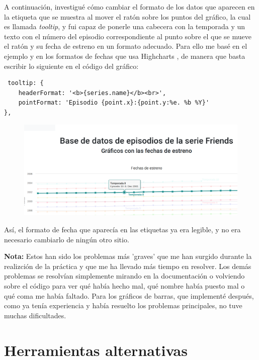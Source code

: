 \documentclass[12pt]{article}
\begin{document}
A continuación, investigué cómo cambiar el formato de los datos que aparecen en la etiqueta que se muestra al mover el ratón sobre los puntos del gráfico, la cual es llamada \textit{tooltip}, y fui capaz de ponerle una cabecera con la temporada y un texto con el número del episodio correspondiente al punto sobre el que se mueve el ratón y su fecha de estreno en un formato adecuado. Para ello me basé en el ejemplo \cite{7} y en los formatos de fechas que usa Highcharts \cite{8}, de manera que basta escribir lo siguiente en el código del gráfico:
\begin{lstlisting}
 tooltip: {
	headerFormat: '<b>{series.name}</b><br>',
	pointFormat: 'Episodio {point.x}:{point.y:%e. %b %Y}'
},
\end{lstlisting}
\begin{figure}[H]
	\centering
	\includegraphics[width=1\linewidth]{captura5}
	\caption{}
	\label{fig:captura5}
\end{figure}

Así, el formato de fecha que aparecía en las etiquetas ya era legible, y no era necesario cambiarlo de ningún otro sitio. 

\textbf{Nota:} Estos han sido los problemas más 'graves' que me han surgido durante la realizción de la práctica y que me ha llevado más tiempo en resolver. Los demás problemas se resolvían simplemente mirando en la documentación o volviendo sobre el código para ver qué había hecho mal, qué nombre había puesto mal o qué coma me había faltado. Para los gráficos de barras, que implementé después, como ya tenía experiencia y había resuelto los problemas principales, no tuve muchas dificultades. 
\newpage
\section{Herramientas alternativas}
\end{document}
